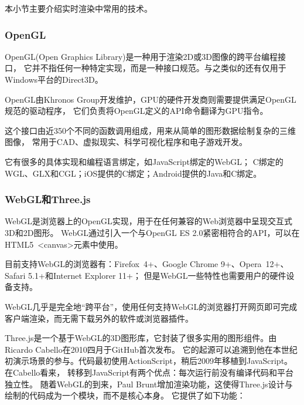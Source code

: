 本小节主要介绍实时渲染中常用的技术。


\subsubsection{OpenGL}


OpenGL(Open Graphics Library)是一种用于渲染2D或3D图像的跨平台编程接口\cite{opengl}，
它并不指任何一种特定实现，而是一种接口规范。与之类似的还有仅用于Windows平台的Direct3D。

OpenGL由Khronos Group开发维护，GPU的硬件开发商则需要提供满足OpenGL规范的驱动程序，
它们负责将OpenGL定义的API命令翻译为GPU指令。

这个接口由近350个不同的函数调用组成，用来从简单的图形数据绘制复杂的三维图像，
常用于CAD、虚拟现实、科学可视化程序和电子游戏开发。 

它有很多的具体实现和编程语言绑定，如JavaScript绑定的WebGL；
C绑定的WGL、GLX和CGL；iOS提供的C绑定；Android提供的Java和C绑定。


\subsubsection{WebGL和Three.js}


WebGL是浏览器上的OpenGL实现，用于在任何兼容的Web浏览器中呈现交互式3D和2D图形\cite{webgl}。
WebGL通过引入一个与OpenGL ES 2.0紧密相符合的API，可以在HTML5 <canvas>元素中使用。

目前支持WebGL的浏览器有：Firefox 4+、Google Chrome 9+、Opera 12+、Safari 5.1+和Internet Explorer 11+；
但是WebGL一些特性也需要用户的硬件设备支持。

WebGL几乎是完全地“跨平台”，使用任何支持WebGL的浏览器打开网页即可完成客户端渲染，而无需下载另外的软件或浏览器插件。

Three.js是一个基于WebGL的3D图形库\cite{threejs}，它封装了很多实用的图形组件。由Ricardo Cabello在2010四月于GitHub首次发布。
它的起源可以追溯到他在本世纪初演示场景的参与。代码最初使用ActionScript，稍后2009年移植到JavaScript。在Cabello看来，
转移到JavaScript有两个优点：每次运行前没有编译代码和平台独立性。
随着WebGL的到来，Paul Brunt增加渲染功能，这使得Three.js设计与绘制的代码成为一个模块，而不是核心本身。
它提供了如下功能：

